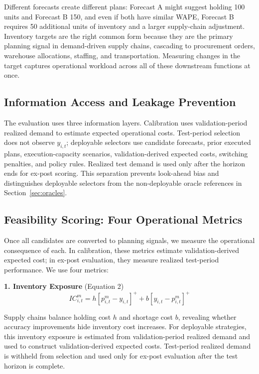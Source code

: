 Different forecasts create different plans: Forecast A might suggest holding 100 units and Forecast B 150, and even if both have similar WAPE, Forecast B requires 50 additional units of inventory and a larger supply-chain adjustment. Inventory targets are the right common form because they are the primary planning signal in demand-driven supply chains, cascading to procurement orders, warehouse allocations, staffing, and transportation. Measuring changes in the target captures operational workload across all of these downstream functions at once.

\subsection{Information Access and Leakage Prevention}

The evaluation uses three information layers. Calibration uses validation-period realized demand to estimate expected operational costs. Test-period selection does not observe $y_{i,t}$; deployable selectors use candidate forecasts, prior executed plans, execution-capacity scenarios, validation-derived expected costs, switching penalties, and policy rules. Realized test demand is used only after the horizon ends for ex-post scoring. This separation prevents look-ahead bias and distinguishes deployable selectors from the non-deployable oracle references in Section~\ref{sec:oracles}.

\subsection{Feasibility Scoring: Four Operational Metrics}

Once all candidates are converted to planning signals, we measure the operational consequence of each. In calibration, these metrics estimate validation-derived expected cost; in ex-post evaluation, they measure realized test-period performance. We use four metrics:

\textbf{1. Inventory Exposure} (Equation 2)
\begin{equation}
IC_{i,t}^{m}=h[p_{i,t}^{m}-y_{i,t}]^{+}+b[y_{i,t}-p_{i,t}^{m}]^{+}
\end{equation}

Supply chains balance holding cost $h$ and shortage cost $b$, revealing whether accuracy improvements hide inventory cost increases. For deployable strategies, this inventory exposure is estimated from validation-period realized demand and used to construct validation-derived expected costs. Test-period realized demand is withheld from selection and used only for ex-post evaluation after the test horizon is complete.

